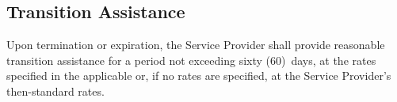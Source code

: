 \subsection{Transition Assistance}
Upon termination or expiration, the Service Provider shall provide reasonable transition assistance for a period not exceeding sixty (60)~days, at the rates specified in the applicable  or, if no rates are specified, at the Service Provider's then-standard rates.
\label{sec:term-effect}

